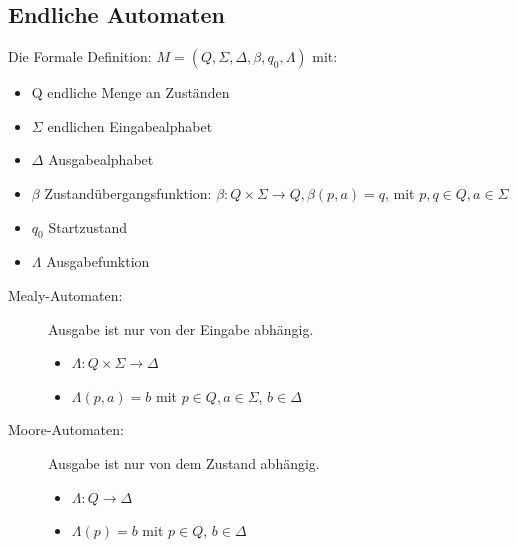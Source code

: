 \documentclass[11pt, fleqn, a4paper, leqno]{scrartcl} %
\begin{document}
	\subsection{Endliche Automaten}
		Die Formale Definition: $M=(Q,\Sigma,\Delta,\beta,q_{0},\Lambda)$ mit:
		\begin{itemize}
			\item Q endliche Menge an Zuständen
			\item $\Sigma$ endlichen Eingabealphabet
			\item $\Delta$ Ausgabealphabet
			\item $\beta$ Zustandübergangsfunktion: $\beta: Q \times \Sigma \rightarrow Q, \beta(p,a) = q$, mit $p,q \in Q, a\in \Sigma$
			\item $q_{0}$ Startzustand
			\item $\Lambda$ Ausgabefunktion
		\end{itemize}
		\begin{description}
			\item[Mealy-Automaten:] Ausgabe ist nur von der Eingabe abhängig. 
				\begin{itemize}
					\item $\Lambda: Q \times \Sigma \rightarrow \Delta$
					\item $\Lambda(p,a) = b$ mit $p\in Q, a \in \Sigma$, $ b\in \Delta$
				\end{itemize}
			\item[Moore-Automaten:] Ausgabe ist nur von dem Zustand abhängig.
				\begin{itemize}
					\item $\Lambda: Q \rightarrow \Delta$
					\item $\Lambda(p) = b$ mit $p\in Q$, $b\in \Delta$					
				\end{itemize}
		\end{description}
\end{document}
